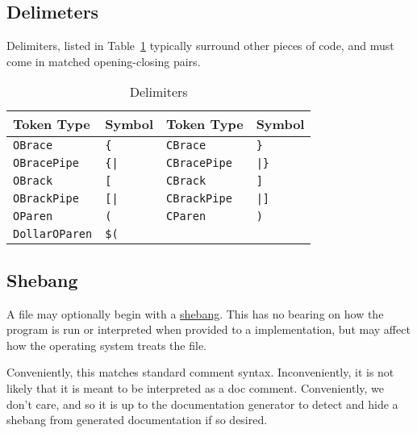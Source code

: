 \subsection{Delimeters}

Delimiters, listed in Table~\ref{tab:delimiters} typically surround other
pieces of code, and must come in matched opening-closing pairs.

\begin{table}[h]
    \centering
    \begin{tabular}[t]{llll}
        \hline
        \textbf{Token Type} & \textbf{Symbol}& \textbf{Token Type} & \textbf{Symbol} \\
        \hline
        \texttt{OBrace} & \texttt{\{}& \texttt{CBrace} & \texttt{\}} \\
        \texttt{OBracePipe} & \texttt{\{|}& \texttt{CBracePipe} & \texttt{|\}} \\
        \texttt{OBrack} & \texttt{[} & \texttt{CBrack} & \texttt{]} \\
        \texttt{OBrackPipe} & \texttt{[|}& \texttt{CBrackPipe} & \texttt{|]} \\
        \texttt{OParen} & \texttt{(} & \texttt{CParen} & \texttt{)} \\
        \texttt{DollarOParen} & \texttt{\$(} & & \\ %
        \hline
    \end{tabular}
    \caption{\label{tab:delimiters}Delimiters}
\end{table}

\subsection{Shebang}

A \Trilogy{} file may optionally begin with a
\href{https://en.wikipedia.org/wiki/Shebang_(Unix)}{shebang}. This has no bearing
on how the program is run or interpreted when provided to a \Trilogy{} implementation,
but may affect how the operating system treats the file.

Conveniently, this matches standard comment syntax. Inconveniently, it is not
likely that it is meant to be interpreted as a doc comment. Conveniently,
we don't care, and so it is up to the documentation generator to detect and
hide a shebang from generated documentation if so desired.

\FloatBarrier
